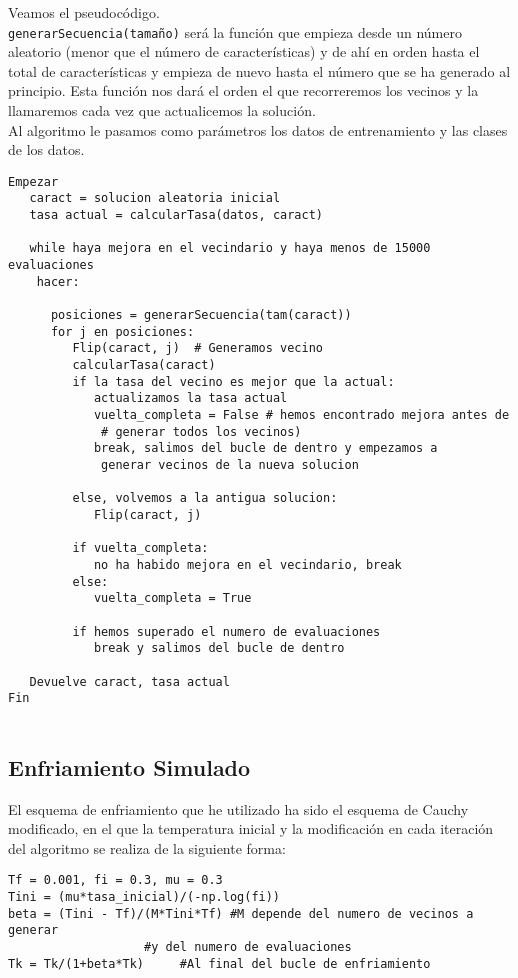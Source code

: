 \documentclass[12pt]{article}
\begin{document}
Veamos el pseudocódigo.\\
\texttt{generarSecuencia(tamaño)} será la función que empieza desde un número aleatorio (menor que el número de características) y de ahí en orden hasta el total de características y empieza de nuevo hasta el número que se ha generado al principio. Esta función nos dará el orden el que recorreremos los vecinos y la llamaremos cada vez que actualicemos la solución.\\
Al algoritmo le pasamos como parámetros los datos de entrenamiento y las clases de los datos.
\begin{lstlisting}
Empezar
   caract = solucion aleatoria inicial
   tasa actual = calcularTasa(datos, caract)
   
   while haya mejora en el vecindario y haya menos de 15000 evaluaciones
    hacer:
      
      posiciones = generarSecuencia(tam(caract))
      for j en posiciones:
         Flip(caract, j)  # Generamos vecino
         calcularTasa(caract)
         if la tasa del vecino es mejor que la actual:
            actualizamos la tasa actual
            vuelta_completa = False # hemos encontrado mejora antes de
             # generar todos los vecinos)
            break, salimos del bucle de dentro y empezamos a 
             generar vecinos de la nueva solucion
         
         else, volvemos a la antigua solucion:
            Flip(caract, j)
            
         if vuelta_completa:
            no ha habido mejora en el vecindario, break
         else:
            vuelta_completa = True
         
         if hemos superado el numero de evaluaciones
            break y salimos del bucle de dentro
   
   Devuelve caract, tasa actual
Fin
   
\end{lstlisting}

\subsection{Enfriamiento Simulado}
El esquema de enfriamiento que he utilizado ha sido el esquema de Cauchy modificado, en el que la temperatura inicial y la modificación en cada iteración del algoritmo se realiza de la siguiente forma:
\begin{lstlisting}
Tf = 0.001, fi = 0.3, mu = 0.3
Tini = (mu*tasa_inicial)/(-np.log(fi))
beta = (Tini - Tf)/(M*Tini*Tf) #M depende del numero de vecinos a generar 
   			       #y del numero de evaluaciones
Tk = Tk/(1+beta*Tk) 	#Al final del bucle de enfriamiento
\end{lstlisting}
\end{document}
